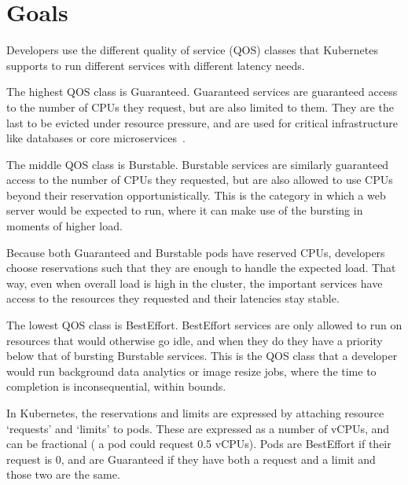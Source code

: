 \section{Goals}
\label{s:goals}


Developers use the different quality of service (QOS) classes that Kubernetes
supports to run different services with different latency needs.

The highest QOS class is Guaranteed. Guaranteed services are guaranteed access
to the number of CPUs they request, but are also limited to them. They are the
last to be evicted under resource pressure, and are used for critical
infrastructure like databases or core microservices~\cite{reddit-kub-qos}.

The middle QOS class is Burstable. Burstable services are similarly guaranteed
access to the number of CPUs they requested, but are also allowed to use CPUs
beyond their reservation opportunistically. This is the category in which a web
server would be expected to run, where it can make use of the bursting in
moments of higher load.

Because both Guaranteed and Burstable pods have reserved CPUs, developers choose
reservations such that they are enough to handle the expected load. That way,
even when overall load is high in the cluster, the important services have
access to the resources they requested and their latencies stay stable.

The lowest QOS class is BestEffort. BestEffort services are only allowed to run
on resources that would otherwise go idle, and when they do they have a priority
below that of bursting Burstable services. This is the QOS class that a
developer would run background data analytics or image resize jobs, where the
time to completion is inconsequential, within bounds.

In Kubernetes, the reservations and limits are expressed by attaching resource
`requests' and `limits' to pods. These are expressed as a number of vCPUs, and
can be fractional (\ie{} a pod could request 0.5 vCPUs). Pods are BestEffort if
their request is 0, and are Guaranteed if they have both a request and a limit
and those two are the same.

